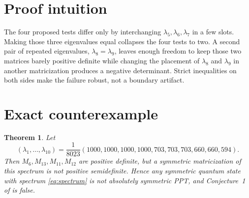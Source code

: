 \documentclass[10pt]{article}
\newtheorem{theorem}{Theorem}
\begin{document}
\section{Proof intuition}
The four proposed tests differ only by interchanging
$\lambda_5,\lambda_6,\lambda_7$ in a few slots.  Making those three
eigenvalues equal collapses the four tests to two.  A second pair of repeated
eigenvalues, $\lambda_8=\lambda_9$, leaves enough freedom to keep those two
matrices barely positive definite while changing the placement of
$\lambda_8$ and $\lambda_9$ in another matricization produces a negative
determinant.  Strict inequalities on both sides make the failure robust, not
a boundary artifact.

\section{Exact counterexample}
\begin{theorem}\label{thm:counterexample}
Let
\begin{equation}\label{eq:spectrum}
(\lambda_1,\ldots,\lambda_{10})
=\frac1{8023}(1000,1000,1000,1000,703,703,703,660,660,594).
\end{equation}
Then $M_6,M_{13},M_{11},M_{12}$ are positive definite, but a symmetric
matricization of this spectrum is not positive semidefinite.  Hence any
symmetric quantum state with spectrum \eqref{eq:spectrum} is not absolutely
symmetric PPT, and Conjecture~1 of \cite{CJMP} is false.
\end{theorem}
\end{document}
